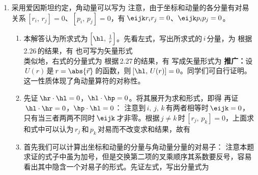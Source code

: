 \begin{enumerate}[label=2.\arabic*]
\item
采用爱因斯坦约定，角动量可以写为
注意，由于坐标和动量的各分量有对易关系$\,[r_i,\,r_j]=0$、$[p_i,\,p_j]=0$，有$\,\eijk r_ir_j=0$、$\eijk p_ip_j=0$。
\begin{enumerate}[label=(\arabic*)]
\item
本解答认为所求式为$\,\Big[\hl,\,\frac{1}{r}\Big]$。先看左式，写出所求式的$\,i\,$分量，为
根据\,2.26\,的结果，有
也可写为矢量形式
\\
类似地，右式的分量式为
根据\,2.27\,的结果，有
写成矢量形式为
\textbf{推广：}设$\,U(r)\,$是$\,r=\abs{\vec{r}}\,$的函数，则$\,[\hl,\,U(r)]=0$。同学们可自行证明。这一性质体现了角动量算符的对称性。
\item
先证$\,\hr\cdot\hl=0$，$\hl\cdot\hp=0$。将其展开为求和形式，即得
再证$\,\hl\cdot\hr=0$，$\hp\cdot\hl=0$：
注意到$\,i,\,j,\,k\,$有两者相等时$\,\eijk=0$，只有当三者两两不同时$\,\eijk\,$才非零。根据$\,j\neq k\,$时$\,[r_j,\,p_k]=0$，上面求和式中可以认为$\,r_j\,$和$\,p_k\,$对易而不改变求和结果，故有
\item
首先我们可以计算出坐标和动量的分量与角动量分量的对易子：
注意本题求证的式子中虽为加号，但是交换第二项的叉乘顺序其系数要反号，容易看出其中隐含一个对易子的形式。先证左式，写出分量式为

\end{enumerate}
\end{enumerate}
